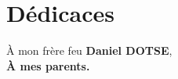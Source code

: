 \chapter*{D\'edicaces}
\vfill
\begin{center}
\`A mon frère feu \textbf{Daniel DOTSE},\\
\vspace{1.5cm}
\textbf{\`A mes parents.}
\end{center}
\vfill
